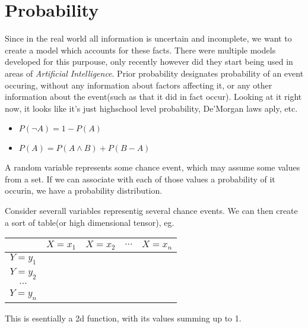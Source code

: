     \section{Probability}
        Since in the real world all information is uncertain and incomplete, we want to create a model which accounts for these facts. There were multiple models developed for this purpouse, only recently however did they start being used in areas of \textit{Artificial Intelligence}.
        {
            Prior probability designates probability of an event occuring, without any information about factors affecting it, or any other information about the event(such as that it did in fact occur).
        }
        {
            Looking at it right now, it looks like it's just highschool level probability, De'Morgan laws aply, etc.
        }
        {
            \begin{itemize}
                    \item $P(\neg A) = 1 - P(A)$
                    \item $P(A) = P(A \wedge B) + P(B-A)$
                    
            \end{itemize}
        }

        {
            A random variable represents some chance event, which may assume some values from a set. If we can associate with each of those values a probability of it occurin, we have a probability distribution.
        }
        {
            Consider severall variables representig several chance events. We can then create a sort of table(or high dimensional tensor), eg.
            \begin{center}
            \begin{tabular}{|c|c|c|c|c|}

            \hline
                 &$X = x_1$&$X = x_2$ & $\cdots $ &$X = x_n$ \\
            \hline
               $ Y = y_1$ & & & & \\
            \hline
                $Y = y_2$ & & & & \\
            \hline
                $\cdots $ & & & & \\
            \hline
                $Y = y_n $ & & & & \\
            \hline
            \end{tabular}
            \end{center}    
            This is esentially a 2d function, with its values summing up to 1.
            
        }

